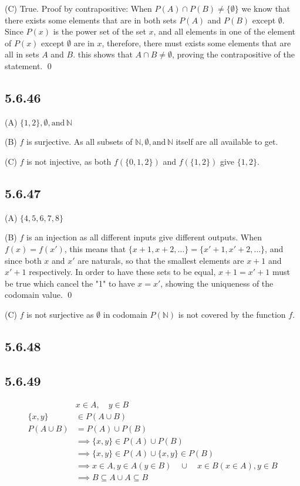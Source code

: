 \documentclass{article}
\begin{document}
(C) True. Proof by contrapositive: When $P(A)\cap P(B)\neq \{\emptyset\}$ we know that there exists some elements that are in both sets $P(A)$ and $P(B)$ except $\emptyset$. Since $P(x)$ is the power set of the set $x$, and all elements in one of the element of $P(x)$ except $\emptyset$ are in $x$, therefore, there must exists some elements that are all in sets $A$ and $B$. this shows that $A\cap B\neq \emptyset$, proving the contrapositive of the statement. \qed

\subsection*{5.6.46}

(A) $\{1,2\},\emptyset,\text{and}\, \mathbb{N}$

(B) $f$ is surjective. As all subsets of $\mathbb{N},\emptyset,\text{and}\, \mathbb{N}$ itself are all available to get. 

(C) $f$ is not injective, as both $f(\{0,1,2\})$ and $f(\{1,2\})$ give $\{1,2\}$.

\subsection*{5.6.47}

(A) $\{4,5,6,7,8\}$

(B) $f$ is an injection as all different inputs give different outputs. When $f(x)=f(x')$, this means that $\{x+1,x+2,\ldots\}=\{x'+1,x'+2,\dots\}$,  and since both $x$ and $x'$ are naturals, so that the smallest elements are $x+1$ and $x'+1$ respectively. In order to have these sets to be equal, $x+1=x'+1$ must be true which cancel the "1" to have $x=x'$, showing the uniqueness of the codomain value. \qed

(C) $f$ is not surjective as $\emptyset$ in codomain $P(\mathbb{N})$ is not covered by the function $f$. 

\subsection*{5.6.48}



\subsection*{5.6.49}

\begin{align*}
    &x\in A, \quad y\in B\\
    \{x,y\}&\in P(A\cup B)\\
    P(A\cup B)&=P(A)\cup P(B)\\
    &\implies \{x,y\} \in P(A)\cup P(B)\\
    &\implies \{x,y\}\in P(A) \cup \{x,y\}\in P(B)\\
    &\implies x\in A, y\in A (y\in B)\quad \cup \quad x\in B (x \in A), y\in B\\
    &\implies B\subseteq A \cup A \subseteq B
\end{align*}
\end{document}
